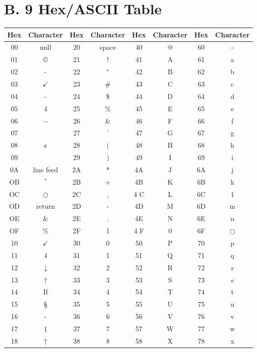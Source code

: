 \documentclass[10pt]{book}
\begin{document}
\section{B. 9 Hex/ASCII Table}
\begin{center}
\begin{tabular}{|c|c|c|c|c|c|c|c|}
\hline
Hex & Character & Hex & Character & Hex & Character & Hex & Character \\
\hline
00 & null & 20 & space & 40 & @ & 60 & - \\
\hline
01 & © & 21 & ! & 41 & A & 61 & a \\
\hline
02 & - & 22 & " & 42 & B & 62 & b \\
\hline
03 & $\checkmark$ & 23 & \# & 43 & C & 63 & c \\
\hline
04 & - & 24 & \$ & 44 & D & 64 & d \\
\hline
05 & 4 & 25 & \% & 45 & E & 65 & e \\
\hline
06 & $\cdots$ & 26 & \& & 46 & F & 66 & f \\
\hline
07 &  & 27 & ' & 47 & G & 67 & g \\
\hline
08 & ¢ & 28 & $($ & 48 & H & 68 & h \\
\hline
09 &  & 29 & ) & 49 & I & 69 & i \\
\hline
0A & line feed & 2A & * & 4A & J & 6A & j \\
\hline
OB & ${ }^{*}$ & 2B & + & 4B & K & 6B & k \\
\hline
OC & $\bigcirc$ & 2C & , & 4 C & L & 6C & 1 \\
\hline
OD & return & 2D & - & 4D & M & 6D & m \\
\hline
OE & \& & 2E & . & 4E & N & 6E & n \\
\hline
OF & \% & 2F & 1 & 4 F & 0 & 6F & $\bigcirc$ \\
\hline
10 & $\checkmark$ & 30 & 0 & 50 & P & 70 & p \\
\hline
11 & 4 & 31 & 1 & 51 & Q & 71 & q \\
\hline
12 & $\downarrow$ & 32 & 2 & 52 & R & 72 & r \\
\hline
13 & $\uparrow$ & 33 & 3 & 53 & S & 73 & s \\
\hline
14 & If & 34 & 4 & 54 & T & 74 & t \\
\hline
15 & § & 35 & 5 & 55 & U & 75 & u \\
\hline
16 & - & 36 & 6 & 56 & V & 76 & v \\
\hline
17 & $\underline{1}$ & 37 & 7 & 57 & W & 77 & w \\
\hline
18 & $\uparrow$ & 38 & 8 & 58 & X & 78 & x \\

\end{tabular}
\end{center}
\end{document}
